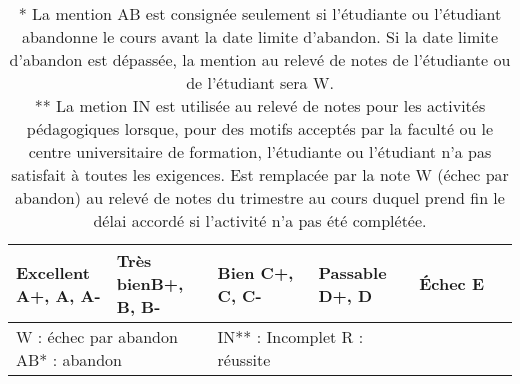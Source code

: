 \documentclass[12]{article}
\begin{document}
	\begin{center}
		\begin{table}[h]
        \begin{tabular}{| p{0.2\linewidth} | p{0.2\linewidth} | p{0.2\linewidth} | p{0.2\linewidth} | p{0.2\linewidth} | } 
        \hline
        \textbf{Excellent} \linebreak A+, A, A- &
		\textbf{Très bien}\hfill\hfill \linebreak B+, B, B- & 
		\textbf{Bien} \linebreak C+, C, C- & 
		\textbf{Passable} \linebreak D+, D &
		\textbf{Échec} \linebreak E \\ [0.5ex] 
        \hline\hline
        \multicolumn{2}{l}{W : échec par abandon\hfill\hfill \linebreak
            AB* : abandon\hfill\hfill \linebreak} &
        \multicolumn{2}{l}{
            IN** : Incomplet\hfill\hfill \linebreak 
            R : réussite\hfill\hfill} \\
		\hline
		\end{tabular}
		\caption*{* La mention AB est consignée seulement si l’étudiante ou l’étudiant abandonne le cours avant la date
		limite d'abandon. Si la date limite d’abandon est dépassée, la mention au relevé de notes de l’étudiante
		ou de l’étudiant sera W.\\
		** La metion IN est utilisée au relevé de notes pour les activités
		pédagogiques lorsque, pour des motifs acceptés par la faculté ou le
		centre universitaire de formation, l’étudiante ou l’étudiant n’a pas
		satisfait à toutes les exigences. Est remplacée par la note W (échec
		par abandon) au relevé de notes du trimestre au cours duquel prend fin
		le délai accordé si l’activité n’a pas été complétée.}
		\end{table}
	\end{center}
\end{document}
